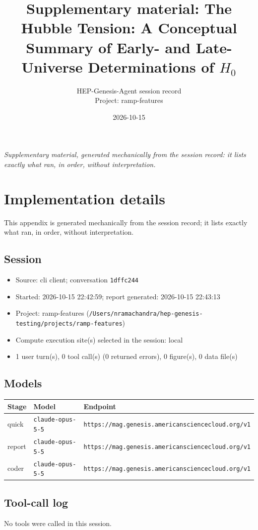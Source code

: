 \documentclass[11pt,a4paper]{article}
\title{Supplementary material: The Hubble Tension: A Conceptual Summary of Early- and Late-Universe Determinations of $H_0$}
\author{HEP-Genesis-Agent session record \\ \small Project: ramp-features}
\date{2026-10-15}
\begin{document}
\maketitle
\noindent\textit{\small Supplementary material, generated mechanically from the session record: it lists exactly what ran, in order, without interpretation.}
\vspace{1em}



\appendix
\section{Implementation details}
\label{app:impl}
This appendix is generated mechanically from the session record; it lists exactly what ran, in order, without interpretation.
\subsection{Session}
\begin{itemize}
  \item Source: cli client; conversation \texttt{1dffc244}
  \item Started: 2026-10-15 22:42:59; report generated: 2026-10-15 22:43:13
  \item Project: ramp-features (\texttt{/\allowbreak{}Users/\allowbreak{}nramachandra/\allowbreak{}hep-genesis-testing/\allowbreak{}projects/\allowbreak{}ramp-features})
  \item Compute execution site(s) selected in the session: local
  \item 1 user turn(s), 0 tool call(s) (0 returned errors), 0 figure(s), 0 data file(s)
\end{itemize}
\subsection{Models}
\begin{longtable}{@{}p{}p{}p{}@{}}
\toprule Stage & Model & Endpoint \\ \midrule \endhead
quick & \texttt{claude-opus-5-5} & \texttt{https:\allowbreak{}/\allowbreak{}/\allowbreak{}mag.genesis.americansciencecloud.org/\allowbreak{}v1} \\
report & \texttt{claude-opus-5-5} & \texttt{https:\allowbreak{}/\allowbreak{}/\allowbreak{}mag.genesis.americansciencecloud.org/\allowbreak{}v1} \\
coder & \texttt{claude-opus-5-5} & \texttt{https:\allowbreak{}/\allowbreak{}/\allowbreak{}mag.genesis.americansciencecloud.org/\allowbreak{}v1} \\
\bottomrule\end{longtable}
\subsection{Tool-call log}
No tools were called in this session.
\end{document}
